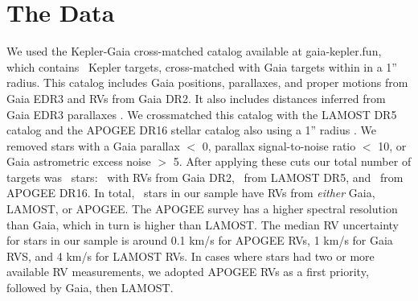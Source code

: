 \section{The Data}
\label{sec:data}

We used the Kepler-Gaia cross-matched catalog available at gaia-kepler.fun,
which contains \nfun\ Kepler targets, cross-matched with Gaia targets within
in a 1'' radius.
This catalog includes Gaia positions, parallaxes, and proper motions from
Gaia EDR3 and RVs from Gaia DR2.
It also includes distances inferred from Gaia EDR3 parallaxes
\citep{bailer-jones2021}.
We crossmatched this catalog with the LAMOST DR5 catalog and the APOGEE DR16
stellar catalog also using a 1'' radius \citep{cui2012, apogee_dr16,
xiang2019}.
We removed stars with a Gaia parallax $<$ 0, parallax signal-to-noise ratio
$<$ 10, or Gaia astrometric excess noise $>$ 5.
After applying these cuts our total number of targets was \nstars\ stars:
\ngaia\ with RVs from Gaia DR2, \nlamost\ from LAMOST DR5, and \napogee\ from
APOGEE DR16.
In total, \nrv\ stars in our sample have RVs from {\it either} Gaia, LAMOST,
or APOGEE.
The APOGEE survey has a higher spectral resolution than Gaia, which in turn is
higher than LAMOST.
The median RV uncertainty for stars in our sample is around 0.1 km/s for
APOGEE RVs, 1 km/s for Gaia RVS, and 4 km/s for LAMOST RVs.
In cases where stars had two or more available RV measurements, we adopted
APOGEE RVs as a first priority, followed by Gaia, then LAMOST.

